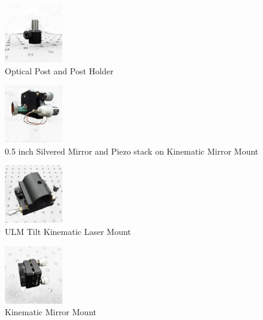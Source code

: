 \begin{figure}[!ht]
\centering
\includegraphics[width=1in]{OpticalPostwPostHolder}
\caption{Optical Post and Post Holder}
\label{fig:opticalpost_postholder}
\end{figure}


\begin{figure}[!ht]
\centering
\includegraphics[width=1in]{PiezoandMirror}
\caption{0.5 inch Silvered Mirror and Piezo stack on Kinematic Mirror Mount}
\label{fig:piezo}
\end{figure}


\begin{figure}[!ht]
\centering
\includegraphics[width=1in]{ULMTiltKinematicLaserMount}
\caption{ULM Tilt Kinematic Laser Mount}
\label{fig:lasermount}
\end{figure}

\begin{figure}[!ht]
\centering
\includegraphics[width=1in]{MirrorMount}
\caption{Kinematic Mirror Mount}
\label{fig:mirrormount}
\end{figure}

